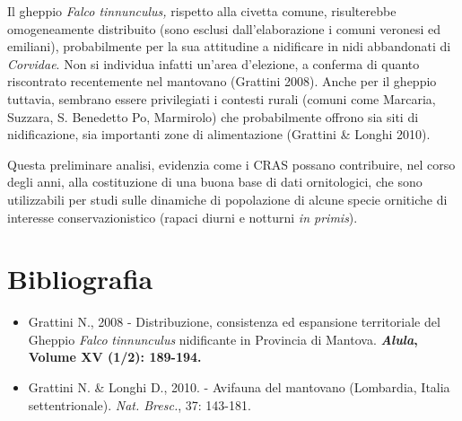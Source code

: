 Il gheppio \textit{Falco tinnunculus,} rispetto alla civetta comune,
risulterebbe omogeneamente distribuito (sono esclusi
dall{\textquoteright}elaborazione i comuni veronesi ed emiliani),
probabilmente per la sua attitudine a nidificare in nidi abbandonati di
\textit{Corvidae}. Non si individua infatti un{\textquoteright}area
d{\textquoteright}elezione, a conferma di quanto riscontrato
recentemente nel mantovano (Grattini 2008). Anche per il gheppio
tuttavia, sembrano essere privilegiati i contesti rurali (comuni come
Marcaria, Suzzara, S. Benedetto Po, Marmirolo) che probabilmente
offrono sia siti di nidificazione, sia importanti zone di alimentazione
(Grattini \& Longhi  2010).  

Questa preliminare analisi, evidenzia come i CRAS possano contribuire,
nel corso degli anni, alla costituzione di una buona base di dati
ornitologici, che sono utilizzabili per studi sulle dinamiche di
popolazione di alcune specie ornitiche di interesse conservazionistico
(rapaci diurni e notturni \textit{in primis}). 

\section*{Bibliografia}
\begin{itemize}
	\item Grattini N.,\textsc{ 2008 - }Distribuzione, consistenza ed espansione
territoriale del Gheppio \textit{Falco} \textit{tinnunculus}
nidificante in Provincia di Mantova.
\textbf{\textmd{\textit{Alula}}}\textbf{\textmd{, Volume XV (1/2):
189-194.}}

	\item Grattini N. \& Longhi D\textsc{., 2010. - }Avifauna del mantovano
(Lombardia, Italia settentrionale).\textit{ Nat. Bresc.}, 37: 143-181.
\end{itemize}

